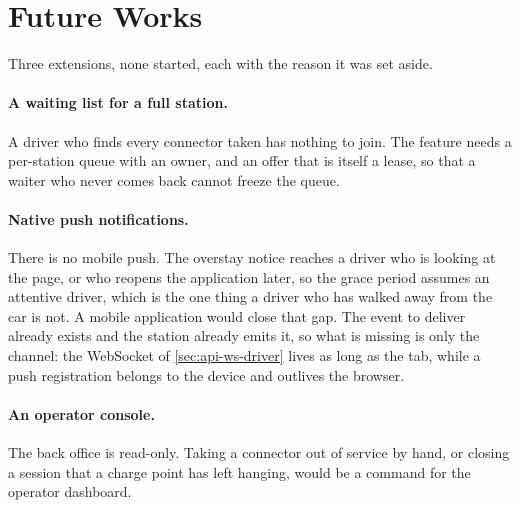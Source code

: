 \section{Future Works}
\label{sec:future}

Three extensions, none started, each with the reason it was set aside.

\paragraph{A waiting list for a full station.} A driver who finds every connector taken has
nothing to join. The feature needs a per-station queue with an owner, and an offer that is
itself a lease, so that a waiter who never comes back cannot freeze the queue.

\paragraph{Native push notifications.} There is no mobile push. The overstay notice reaches a
driver who is looking at the page, or who reopens the application later, so the grace period
assumes an attentive driver, which is the one thing a driver who has walked away from the car
is not. A mobile application would close that gap. The event to deliver already exists and
the station already emits it, so what is missing is only the channel: the WebSocket of
\cref{sec:api-ws-driver} lives as long as the tab, while a push registration belongs to the
device and outlives the browser.

\paragraph{An operator console.} The back office is read-only. Taking a connector out of
service by hand, or closing a session that a charge point has left hanging, would be a
command for the operator dashboard. 
